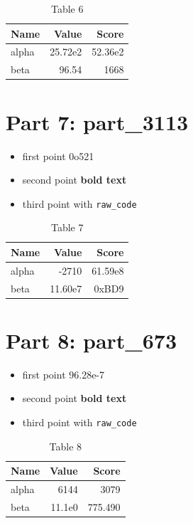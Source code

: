 \documentclass[11pt,a4paper]{article}
\begin{document}
\begin{table}[h]
  \centering
  \begin{tabular}{lrr}
    \hline
    Name & Value & Score \\ \hline
    alpha & 25.72e2 & 52.36e2 \\
    beta & 96.54 & 1668 \\ \hline
  \end{tabular}
  \caption{Table 6}
\end{table}

\section{Part 7: part_3113}

\begin{itemize}
  \item first point 0o521
  \item second point \textbf{bold text}
  \item third point with \verb|raw_code|
\end{itemize}

\begin{table}[h]
  \centering
  \begin{tabular}{lrr}
    \hline
    Name & Value & Score \\ \hline
    alpha & -2710 & 61.59e8 \\
    beta & 11.60e7 & 0xBD9 \\ \hline
  \end{tabular}
  \caption{Table 7}
\end{table}

\section{Part 8: part_673}

\begin{itemize}
  \item first point 96.28e-7
  \item second point \textbf{bold text}
  \item third point with \verb|raw_code|
\end{itemize}

\begin{table}[h]
  \centering
  \begin{tabular}{lrr}
    \hline
    Name & Value & Score \\ \hline
    alpha & 6144 & 3079 \\
    beta & 11.1e0 & 775.490 \\ \hline
  \end{tabular}
  \caption{Table 8}
\end{table}
\end{document}

